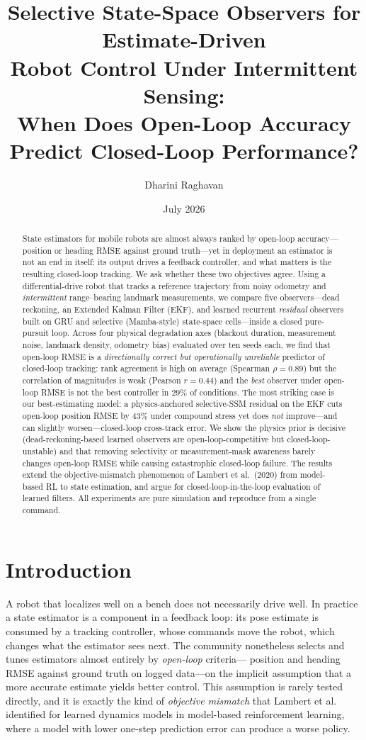 \documentclass[10pt]{article}
\title{\vspace{-2em}\textbf{Selective State-Space Observers for Estimate-Driven\\
Robot Control Under Intermittent Sensing:\\
When Does Open-Loop Accuracy Predict Closed-Loop Performance?}}
\author{Dharini Raghavan}
\affil{\small ECE 6562, Georgia Institute of Technology \\ \texttt{draghavan7}}
\date{\vspace{-1em}\small July 2026}
\begin{document}
\maketitle

\begin{abstract}
\noindent
State estimators for mobile robots are almost always ranked by open-loop accuracy---
position or heading RMSE against ground truth---yet in deployment an estimator is not an end
in itself: its output drives a feedback controller, and what matters is the resulting closed-loop
tracking. We ask whether these two objectives agree. Using a differential-drive robot that
tracks a reference trajectory from noisy odometry and \emph{intermittent} range--bearing landmark
measurements, we compare five observers---dead reckoning, an Extended Kalman Filter (EKF), and
learned recurrent \emph{residual} observers built on GRU and selective (Mamba-style) state-space
cells---inside a closed pure-pursuit loop. Across four physical degradation axes (blackout
duration, measurement noise, landmark density, odometry bias) evaluated over ten seeds each, we
find that open-loop RMSE is a \emph{directionally correct but operationally unreliable} predictor
of closed-loop tracking: rank agreement is high on average (Spearman $\rho=0.89$) but the
correlation of magnitudes is weak (Pearson $r=0.44$) and the \emph{best} observer under open-loop
RMSE is not the best controller in $29\%$ of conditions. The most striking case is our
best-estimating model: a physics-anchored selective-SSM residual on the EKF cuts open-loop
position RMSE by $43\%$ under compound stress yet does \emph{not} improve---and can slightly
worsen---closed-loop cross-track error. We show the physics prior is decisive (dead-reckoning-based
learned observers are open-loop-competitive but closed-loop-unstable) and that removing selectivity
or measurement-mask awareness barely changes open-loop RMSE while causing catastrophic closed-loop
failure. The results extend the objective-mismatch phenomenon of Lambert et al.\ (2020) from
model-based RL to state estimation, and argue for closed-loop-in-the-loop evaluation of learned
filters. All experiments are pure simulation and reproduce from a single command.
\end{abstract}

\section{Introduction}
A robot that localizes well on a bench does not necessarily drive well. In practice a state
estimator is a component in a feedback loop: its pose estimate is consumed by a tracking
controller, whose commands move the robot, which changes what the estimator sees next. The
community nonetheless selects and tunes estimators almost entirely by \emph{open-loop} criteria---
position and heading RMSE against ground truth on logged data---on the implicit assumption that a
more accurate estimate yields better control. This assumption is rarely tested directly, and it is
exactly the kind of \emph{objective mismatch} that Lambert et al.~\cite{lambert} identified for
learned dynamics models in model-based reinforcement learning, where a model with lower one-step
prediction error can produce a worse policy.
\end{document}
